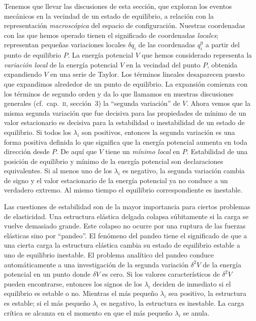 \documentclass[12pt,a4paper]{book}
\begin{document}
Tenemos que llevar las discusiones de esta sección, que exploran los eventos mecánicos en la vecindad de un estado de equilibrio, a relación con la representación \textit{macroscópica} del espacio de configuración. Nuestras coordenadas con las que hemos operado tienen el significado de coordenadas \textit{locales}; representan pequeñas variaciones locales $\delta q_i$ de las coordenadas $q_i^0$ a partir del punto de equilibrio $P$. La energía potencial $V$ que hemos considerado representa la \textit{variación local} de la energía potencial $V$ en la vecindad del punto $P$, obtenida expandiendo $V$ en una serie de Taylor. Los términos lineales desaparecen puesto que expandimos alrededor de un punto de equilibrio. La expansión comienza con los términos de segundo orden y da lo que llamamos en nuestras discusiones generales (cf.\ cap.~\textsc{ii}, sección~3) la ``segunda variación'' de $V$. Ahora vemos que la misma segunda variación que fue decisiva para las propiedades de mínimo de un valor estacionario es decisiva para la estabilidad o inestabilidad de un estado de equilibrio. Si todos los $\lambda_i$ son positivos, entonces la segunda variación es una forma positiva definida lo que significa que la energía potencial aumenta en toda dirección desde $P$. De aquí que $V$ tiene un \textit{mínimo local} en $P$. Estabilidad de una posición de equilibrio y mínimo de la energía potencial son declaraciones equivalentes. Si al menos uno de los $\lambda_i$ es negativo, la segunda variación cambia de signo y el valor estacionario de la energía potencial ya no conduce a un verdadero extremo. Al mismo tiempo el equilibrio correspondiente es inestable.

Las cuestiones de estabilidad son de la mayor importancia para ciertos problemas de elasticidad. Una estructura elástica delgada colapsa súbitamente si la carga se vuelve demasiado grande. Este colapso no ocurre por una ruptura de las fuerzas elásticas sino por ``pandeo''. El fenómeno del pandeo tiene el significado de que a una cierta carga la estructura elástica cambia su estado de equilibrio estable a uno de equilibrio inestable. El problema analítico del pandeo conduce automáticamente a una investigación de la segunda variación $\delta^2 V$ de la energía potencial en un punto donde $\delta V$ es cero. Si los valores característicos de $\delta^2 V$ pueden encontrarse, entonces los signos de los $\lambda_i$ deciden de inmediato si el equilibrio es estable o no. Mientras el más pequeño $\lambda_i$ sea positivo, la estructura es estable; si el más pequeño $\lambda_i$ es negativo, la estructura es inestable. La carga crítica se alcanza en el momento en que el más pequeño $\lambda_i$ se anula.
\end{document}
